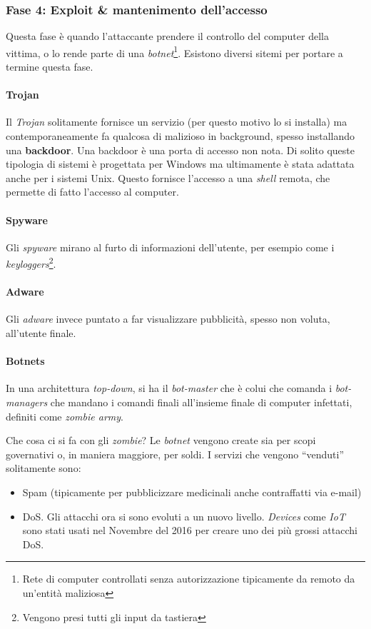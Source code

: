 \subsubsection{Fase 4: Exploit \& mantenimento dell'accesso}

Questa fase è quando l'attaccante prendere il controllo del computer della 
vittima, o lo rende parte di una \textit{botnet}\footnote{Rete di computer 
controllati senza autorizzazione tipicamente da remoto da un'entità maliziosa}. 
Esistono diversi sitemi per portare a termine questa fase.

\paragraph*{Trojan} Il \textit{Trojan} solitamente fornisce un servizio (per 
questo motivo lo si installa) ma contemporaneamente fa qualcosa di malizioso in 
background, spesso installando una \textbf{backdoor}.
Una backdoor è una porta di accesso non nota. Di solito queste tipologia di 
sistemi è progettata per Windows ma ultimamente è stata adattata anche per i 
sistemi Unix. Questo fornisce l'accesso a una \textit{shell} remota, che 
permette di fatto l'accesso al computer.

\paragraph*{Spyware} Gli \textit{spyware} mirano al furto di informazioni 
dell'utente, per esempio come i \textit{keyloggers}\footnote{Vengono presi tutti 
gli input da tastiera}. 

\paragraph*{Adware} Gli \textit{adware} invece puntato a far visualizzare 
pubblicità, spesso non voluta, all'utente finale.

\paragraph*{Botnets}

In una architettura \textit{top-down}, si ha il \textit{bot-master} che è colui 
che comanda i \textit{bot-managers} che mandano i comandi finali all'insieme 
finale di computer infettati, definiti come \textit{zombie army}.

Che cosa ci si fa con gli \textit{zombie}? Le \textit{botnet} vengono create 
sia per scopi governativi o, in maniera maggiore, per soldi. I servizi che 
vengono ``venduti'' solitamente sono:
\begin{itemize}
\item Spam (tipicamente per pubblicizzare medicinali anche contraffatti via 
e-mail)
\item DoS. Gli attacchi ora si sono evoluti a un nuovo livello. \textit{Devices} 
come \textit{IoT} sono stati usati nel Novembre del 2016 per creare uno dei più 
grossi attacchi DoS.
\end{itemize}

